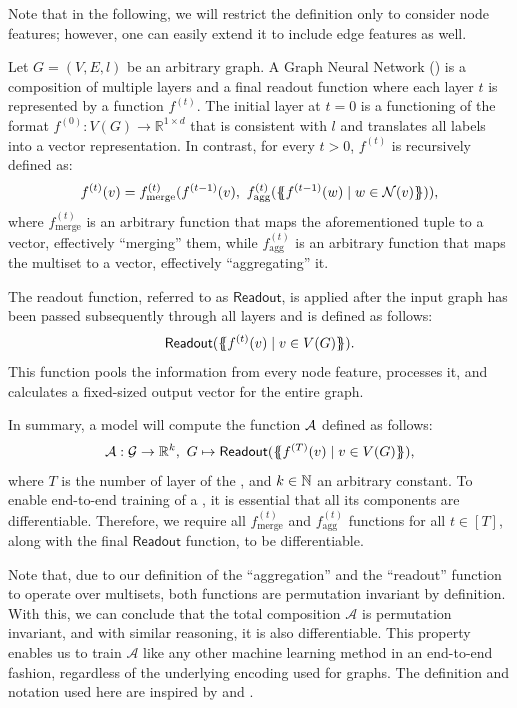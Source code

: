 Note that in the following, we will restrict the definition only to consider node features; however, one can easily extend it to include edge features as well.

\begin{definition}\label{def:gnn}
    Let $G = (V, E, l)$ be an arbitrary graph. A \textsf{Graph Neural Network} (\gnn) is a composition of multiple layers and a final readout function where each layer $t$ is represented by a function $f^{(t)}$. The initial layer at $t=0$ is a functioning of the format $f^{(0)}: V(G) \rightarrow \mathbb{R}^{1 \times d}$ that is consistent with $l$ and translates all labels into a vector representation. In contrast, for every $t > 0$, $f^{(t)}$ is recursively defined as:
    \begin{align*}
        f^{(t)}(v) = f^{(t)}_{\text{merge}} (f^{(t-1)}(v), \  f^{(t)}_{\text{agg}}( \{\!\!\{ f^{(t-1)}(w) \mid w \in \mathcal{N}(v) \}\!\!\} )),
    \end{align*}
    where $f^{(t)}_{\text{merge}}$ is an arbitrary function that maps the aforementioned tuple to a vector, effectively ``merging'' them, while $f^{(t)}_{\text{agg}}$ is an arbitrary function that maps the multiset to a vector, effectively ``aggregating'' it.
    
    The readout function, referred to as $\textsf{Readout}$, is applied after the input graph has been passed subsequently through all layers and is defined as follows:
    \begin{align*}
        \textsf{Readout}(\{\!\!\{ f^{(t)}(v) \mid v \in V(G) \}\!\!\}).
    \end{align*}
    This function pools the information from every node feature, processes it, and calculates a fixed-sized output vector for the entire graph.
    
    In summary, a \gnn model will compute the function $\mathcal{A}$ defined as follows:
    \begin{align*}
        \mathcal{A}: \mathcal{G} \rightarrow \mathbb{R}^k, \ G \mapsto \textsf{Readout}(\{\!\!\{ f^{(T)}(v) \mid v \in V(G) \}\!\!\}),
    \end{align*}
    where $T$ is the number of layer of the \gnn, and $k \in \mathbb{N}$ an arbitrary constant. To enable end-to-end training of a \gnn, it is essential that all its components are differentiable. Therefore, we require all $f^{(t)}_{\text{merge}}$ and $f^{(t)}_{\text{agg}}$ functions for all $t \in [T]$, along with the final $\textsf{Readout}$ function, to be differentiable.
\end{definition}
Note that, due to our definition of the ``aggregation'' and the ``readout'' function to operate over multisets, both functions are permutation invariant by definition. With this, we can conclude that the total composition $\mathcal{A}$ is permutation invariant, and with similar reasoning, it is also differentiable. This property enables us to train $\mathcal{A}$ like any other machine learning method in an end-to-end fashion, regardless of the underlying encoding used for graphs. The definition and notation used here are inspired by \cite{Morris2018} and \cite{Xu2018}.


